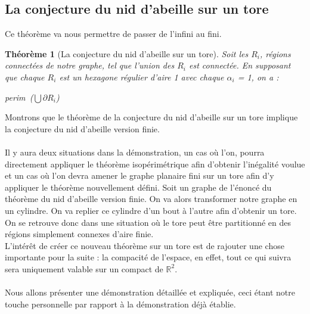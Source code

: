\documentclass{book}
\newtheorem{theorem}{Théorème}
\begin{document}
\subsection{La conjecture du nid d'abeille sur un tore}
{\noindent Ce théorème va nous permettre de passer de l'infini au fini.}

\begin{tcolorbox}[colback=green!6]
\begin{theorem}[La conjecture du nid d'abeille sur un tore]
Soit les $R_i$, régions connectées de notre graphe, tel que l'union des $R_i$ est connectée. 
En supposant que chaque $R_i$ est un hexagone régulier d'aire 1 avec chaque $\alpha_i$ = 1, on a :\\
\centerline{perim~(${\bigcup}{\partial}{R_i}$)}
\end{theorem}
\end{tcolorbox}

{\noindent Montrons que le théorème de la conjecture du nid d'abeille sur un tore implique la conjecture du nid d'abeille version finie.} \\\\
Il y aura deux situations dans la démonstration, un cas où l'on, pourra directement appliquer le théorème isopérimétrique afin d'obtenir l'inégalité voulue et un cas où l'on devra amener le graphe planaire fini sur un tore afin d'y appliquer le théorème nouvellement défini. Soit un graphe de l'énoncé du théorème du nid d'abeille version finie. On va alors transformer notre graphe en un cylindre. On va replier ce cylindre d'un bout à l'autre afin d'obtenir un tore. On se retrouve donc dans une situation où le tore peut être partitionné en des régions simplement connexes d'aire finie.\\
L'intérêt de créer ce nouveau théorème sur un tore est de rajouter une chose importante pour la suite : la compacité de l'espace, en effet, tout ce qui suivra sera uniquement valable sur un compact de $\mathbb{R}^2$.\\\\
Nous allons présenter une démonstration détaillée et expliquée, ceci étant notre touche personnelle par rapport à la démonstration déjà établie.
\end{document}
